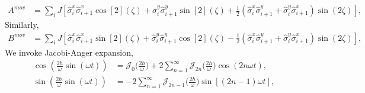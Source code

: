 \documentclass[aps,prb,reprint,showpacs,floatfix,superscriptaddress, onecolumn, nofootinbib, 9pt]{revtex4-2}
\begin{document}
\begin{enumerate}
{\begin{align}
	A^{mov} &= \sum_{i} J \left[ \hat{\sigma}^x_i \hat{\sigma}^x_{i+1} \cos[2](\zeta) + \hat{\sigma}^y_i \hat{\sigma}^y_{i+1} \sin[2](\zeta)+ \frac12\left(\hat{\sigma}^x_i \hat{\sigma}^y_{i+1} + \hat{\sigma}^y_i \hat{\sigma}^x_{i+1}\right)\sin(2\zeta)\right],
	\label{eq:amov}
\end{align}
Similarly,
\begin{align}
	B^{mov} &= \sum_{i} J \left[ \hat{\sigma}^x_i \hat{\sigma}^x_{i+1} \sin[2](\zeta) + \hat{\sigma}^y_i \hat{\sigma}^y_{i+1} \cos[2](\zeta)- \frac12\left(\hat{\sigma}^x_i \hat{\sigma}^y_{i+1} + \hat{\sigma}^y_i \hat{\sigma}^x_{i+1}\right)\sin(2\zeta)\right],
	\label{eq:bmov}
\end{align}
We invoke Jacobi-Anger expansion,
\begin{align*}
\cos(\frac{2h}{\omega}\sin(\omega t)) &= \mathcal{J}_0\Big(\frac{2h}{\omega}\Big) + 2 \sum_{n=1}^\infty \mathcal{J}_{2n}\Big(\frac{2h}{\omega}\Big)\cos(2n\omega t),\\
\sin(\frac{2h}{\omega}\sin(\omega t)) &=-2 \sum_{n=1}^\infty \mathcal{J}_{2n-1}\Big(\frac{2h}{\omega}\Big)\sin[(2n-1)\omega t],
\end{align*}

}
\end{enumerate}
\end{document}
